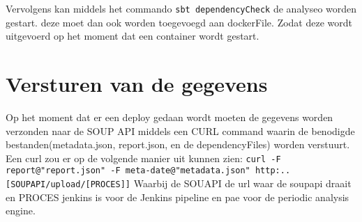 Vervolgens kan middels het commando \texttt{sbt dependencyCheck} de analyseo worden gestart. deze moet dan ook worden toegevoegd aan dockerFile. Zodat deze wordt uitgevoerd op het moment dat een container wordt gestart.


\section{Versturen van de gegevens}
Op het moment dat er een deploy gedaan wordt moeten de gegevens worden verzonden naar de SOUP API middels een CURL command waarin de benodigde bestanden(metadata.json, report.json, en de dependencyFiles) worden verstuurt. Een curl zou er op de volgende manier uit kunnen zien: \texttt{curl -F report@"report.json" -F meta-date@"metadata.json" http:..[SOUPAPI/upload/[PROCES]]} Waarbij de SOUAPI de url waar de soupapi draait en PROCES jenkins is voor de Jenkins pipeline en pae voor de periodic analysis engine.


